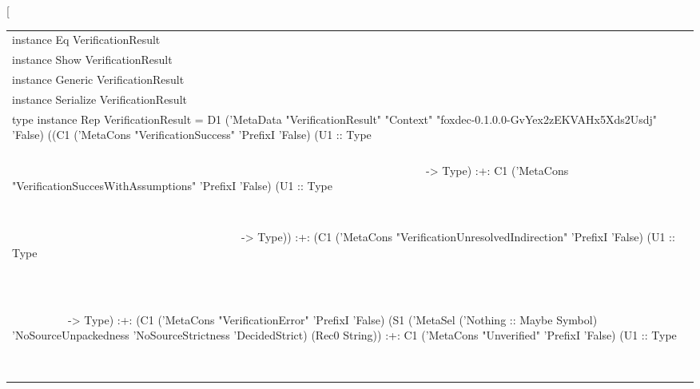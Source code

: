 \begin{haddockdesc}
\item[\begin{tabular}{@{}l}
instance Eq VerificationResult\\instance Show VerificationResult\\instance Generic VerificationResult\\instance Serialize VerificationResult\\type instance Rep VerificationResult = D1 ('MetaData "VerificationResult" "Context" "foxdec-0.1.0.0-GvYex2zEKVAHx5Xds2Usdj" 'False) ((C1 ('MetaCons "VerificationSuccess" 'PrefixI 'False) (U1 :: Type\\\ \ \ \ \ \ \ \ \ \ \ \ \ \ \ \ \ \ \ \ \ \ \ \ \ \ \ \ \ \ \ \ \ \ \ \ \ \ \ \ \ \ \ \ \ \ \ \ \ \ \ \ \ \ \ \ \ \ \ \ \ \ \ \ \ \ \ \ \ \ \ \ \ \ \ \ \ \ \ \ \ \ \ \ \ \ \ \ \ \ \ \ \ \ \ \ \ \ \ \ \ \ \ \ \ \ \ \ \ \ \ \ \ \ \ \ \ \ \ \ \ \ \ \ \ \ \ \ \ \ \ \ \ \ \ \ \ \ \ \ \ \ \ \ \ \ \ \ \ \ \ \ \ \ \ \ \ \ \ \ \ \ \ \ \ \ \ \ \ \ \ \ \ \ \ \ \ \ \ \ \ \ \ \ \ \ \ \ \ \ \ \ \ \ -> Type) :+: C1 ('MetaCons "VerificationSuccesWithAssumptions" 'PrefixI 'False) (U1 :: Type\\\ \ \ \ \ \ \ \ \ \ \ \ \ \ \ \ \ \ \ \ \ \ \ \ \ \ \ \ \ \ \ \ \ \ \ \ \ \ \ \ \ \ \ \ \ \ \ \ \ \ \ \ \ \ \ \ \ \ \ \ \ \ \ \ \ \ \ \ \ \ \ \ \ \ \ \ \ \ \ \ \ \ \ \ \ \ \ \ \ \ \ \ \ \ \ \ \ \ \ \ \ \ \ \ \ \ \ \ \ \ \ \ \ \ \ \ \ \ \ \ \ \ \ \ \ \ \ \ \ \ \ \ \ \ \ \ \ \ \ \ \ \ \ \ \ \ \ \ \ \ \ \ \ \ \ \ \ \ \ \ \ \ \ \ \ \ \ \ \ \ \ \ \ \ \ \ \ \ \ \ \ \ \ \ \ \ \ \ \ \ \ \ \ \ \ \ \ \ \ \ \ \ \ \ \ \ \ \ \ \ \ \ \ \ \ \ \ \ \ \ \ \ \ \ \ \ \ \ \ \ \ \ \ \ \ \ \ \ \ \ \ \ \ \ \ \ \ \ \ \ \ \ \ \ \ \ \ \ \ \ \ \ \ \ \ \ \ \ \ \ \ \ \ \ \ \ \ \ \ \ \ -> Type)) :+: (C1 ('MetaCons "VerificationUnresolvedIndirection" 'PrefixI 'False) (U1 :: Type\\\ \ \ \ \ \ \ \ \ \ \ \ \ \ \ \ \ \ \ \ \ \ \ \ \ \ \ \ \ \ \ \ \ \ \ \ \ \ \ \ \ \ \ \ \ \ \ \ \ \ \ \ \ \ \ \ \ \ \ \ \ \ \ \ \ \ \ \ \ \ \ \ \ \ \ \ \ \ \ \ \ \ \ \ \ \ \ \ \ \ \ \ \ \ \ \ \ \ \ \ \ \ \ \ \ \ \ \ \ \ \ \ \ \ \ \ \ \ \ \ \ \ \ \ \ \ \ \ \ \ \ \ \ \ \ \ \ \ \ \ \ \ \ \ \ \ \ \ \ \ \ \ \ \ \ \ \ \ \ \ \ \ \ \ \ \ \ \ \ \ \ \ \ \ \ \ \ \ \ \ \ \ \ \ \ \ \ \ \ \ \ \ \ \ \ \ \ \ \ \ \ \ \ \ \ \ \ \ \ \ \ \ \ \ \ \ \ \ \ \ \ \ \ \ \ \ \ \ \ \ \ \ \ \ \ \ \ \ \ \ \ \ \ \ \ \ \ \ \ \ \ \ \ \ \ \ \ \ \ \ \ \ \ \ \ \ \ \ \ \ \ \ \ \ \ \ \ \ \ \ \ \ \ \ \ \ \ \ \ \ \ \ \ \ \ \ \ \ \ \ \ \ \ \ \ \ \ \ \ \ \ \ \ \ \ \ \ \ \ \ \ \ \ \ \ \ \ \ \ \ \ \ \ \ \ \ \ \ \ \ \ \ \ \ \ \ \ \ \ \ \ \ \ \ \ \ \ \ \ \ \ \ \ \ \ \ \ \ \ \ -> Type) :+: (C1 ('MetaCons "VerificationError" 'PrefixI 'False) (S1 ('MetaSel ('Nothing :: Maybe Symbol) 'NoSourceUnpackedness 'NoSourceStrictness 'DecidedStrict) (Rec0 String)) :+: C1 ('MetaCons "Unverified" 'PrefixI 'False) (U1 :: Type\\\ \ \ \ \ \ \ \ \ \ \ \ \ \ \ \ \ \ \ \ \ \ \ \ \ \ \ \ \ \ \ \ \ \ \ \ \ \ \ \ \ \ \ \ \ \ \ \ \ \ \ \ \ \ \ \ \ \ \ \ \ \ \ \ \ \ \ \ \ \ \ \ \ \ \ \ \ \ \ \ \ \ \ \ \ \ \ \ \ \ \ \ \ \ \ \ \ \ \ \ \ \ \ \ \ \ \ \ \ \ \ \ \ \ \ \ \ \ \ \ \ \ \ \ \ \ \ \ \ \ \ \ \ \ \ \ \ \ \ \ \ \ \ \ \ \ \ \ \ \ \ \ \ \ \ \ \ \ \ \ \ \ \ \ \ \ \ \ \ \ \ \ \ \ \ \ \ \ \ \ \ \ \ \ \ 
\end{tabular}
\end{haddockdesc}
